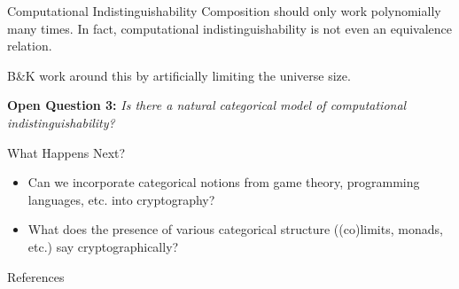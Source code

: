 \documentclass{beamer}
\begin{document}
\begin{frame}{Computational Indistinguishability}
	Composition should only work polynomially many times.\pause{} In fact,
	computational indistinguishability is not even an equivalence relation.\pause

	B\&K work around this by artificially limiting the universe size.\pause

	\textbf{Open Question 3:} \emph{Is there a natural categorical model of
		computational indistinguishability?}


\end{frame}



\begin{frame}{What Happens Next?}
	\pause
	\begin{itemize}
		\item Can we incorporate categorical notions from game theory, programming
		      languages, etc. into cryptography?\pause
		\item What does the presence of various categorical structure ((co)limits,
		      monads, etc.) say cryptographically?
	\end{itemize}
\end{frame}

\begin{frame}[shrink=50,fragile]{References}
	\begin{multicols}{3}
		\printbibliography[heading=none, env=midbib]
	\end{multicols}
\end{frame}
\end{document}
